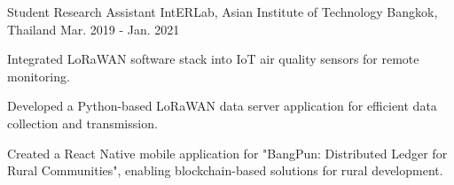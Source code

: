 \begin{cventries}
\cventry
{Student Research Assistant} %
{IntERLab, Asian Institute of Technology} %
{Bangkok, Thailand} %
{Mar. 2019 - Jan. 2021} %
{\begin{cvitems} %
		\item {Integrated LoRaWAN software stack into IoT air quality sensors for remote monitoring.}
		\item {Developed a Python-based LoRaWAN data server application for efficient data collection and transmission.}
		\item {Created a React Native mobile application for "BangPun: Distributed Ledger for Rural Communities", enabling blockchain-based solutions for rural development.}
\end{cvitems}}
\end{cventries}
